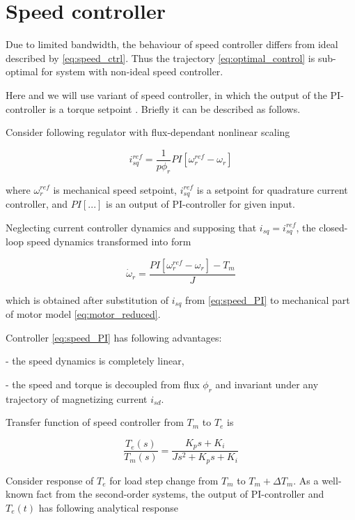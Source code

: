 \documentclass[journal]{IEEEtran}
\begin{document}
\section{Speed controller}

Due to limited bandwidth, the behaviour of speed controller differs from ideal described by \eqref{eq:speed_ctrl}. Thus the trajectory \eqref{eq:optimal_control} is sub-optimal for system with non-ideal speed controller.

Here and we will use variant of speed controller, in which the output of the PI-controller is a torque setpoint \cite{11}. Briefly it can be described as follows.

Consider following regulator with flux-dependant nonlinear scaling

\begin{equation}\label{eq:speed_PI}
i_{sq}^{ref} = \frac{1}{p \phi_r} PI[\omega_r^{ref} - \omega_r]
\end{equation}

where $\omega_r^{ref}$ is mechanical speed setpoint, $i_{sq}^{ref}$ is a setpoint for quadrature current controller, and $PI[...]$ is an output of PI-controller for given input. 

Neglecting current controller dynamics and supposing that $i_{sq} = i_{sq}^{ref}$, the closed-loop speed dynamics transformed into form

\begin{equation}
\dot \omega_r = \frac{PI[\omega_r^{ref} - \omega_r] - T_m}{J}
\end{equation}

which is obtained after substitution of $i_{sq}$ from \eqref{eq:speed_PI} to mechanical part of motor model \eqref{eq:motor_reduced}.

Controller \eqref{eq:speed_PI} has following advantages:

- the speed dynamics is completely linear,

- the speed and torque is decoupled from flux $\phi_r$ and invariant under any trajectory of magnetizing current $i_{sd}$.

Transfer function of speed controller from $T_m$ to $T_e$ is

\begin{equation}
\frac{T_e(s)}{T_m(s)} = \frac{K_p s + K_i}{J s^2 + K_p s + K_i}
\end{equation}

Consider response of $T_e$ for load step change from $T_m$ to $T_m + \Delta T_m$. As a well-known fact from the second-order systems, the output of PI-controller and $T_e(t)$ has following analytical response
\end{document}
